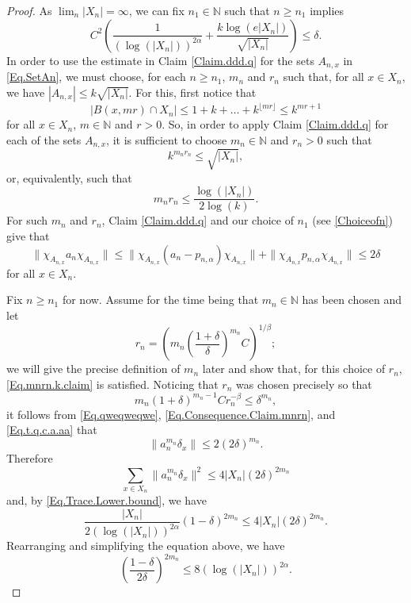 \documentclass[11pt]{amsart}
\newcommand{\N}{\mathbb{N}}
\numberwithin{equation}{section}
\theoremstyle{definition}
\theoremstyle{remark}
\begin{document}
\begin{proof}
As $\lim_n|X_n|=\infty$, we can fix $n_1\in\N$ such that $n\geq n_1$ implies
\begin{equation}\label{Choiceofn}C^2\left(\frac{1}{(\log(|X_n|))^ {2\alpha}}+\frac{k\log(e|X_n|)}{\sqrt{|X_n|}}\right)\leq \delta.\end{equation}
In order to use the estimate in Claim \ref{Claim.ddd.q} for the sets $A_{n,x}$ in \eqref{Eq.SetAn},  we must choose, for each $n\geq n_1$, $m_n$ and $r_n$ such that, for all $x\in  X_n$, we have  $|A_{n,x}|\leq k\sqrt{|X_n|}$. For this, first notice that
\[|B(x,mr)\cap X_n|\leq 1+k+\ldots+k^{\lfloor mr\rfloor}\leq k^{mr+1}\]
for all $x\in X_n$, $m\in \N$ and $r>0$.
So, in order to apply  Claim \ref{Claim.ddd.q} for each of the sets $A_{n,x}$, it is sufficient to choose $m_n\in\N$ and $r_n>0$ such that
\begin{equation*} k^{m_nr_n}\leq \sqrt{|X_n|},\end{equation*}
or, equivalently, such that
\begin{equation}\label{Eq.mnrn.k.claim}{m_nr_n}\leq\frac{ \log(|X_n|)}{2\log(k)}.\end{equation}
For such $m_n$ and $r_n$, Claim \ref{Claim.ddd.q} and our choice of $n_1$ (see \eqref{Choiceofn}) give that
\begin{equation}\label{Eq.Consequence.Claim.mnrn}\|\chi_{A_{n,x}}a_n\chi_{A_{n,x}}\|\leq \|\chi_{A_{n,x}}(a_n-p_{n,\alpha})\chi_{A_{n,x}}\|+\|\chi_{A_{n,x}}p_{n,\alpha}\chi_{A_{n,x}}\|\leq 2\delta\end{equation}
for all $x\in X_n$.

Fix $n\geq n_1$ for now. Assume for the time being that $m_n\in\N$ has been chosen and let
\begin{equation}\label{Eq.Choice.of.rn.1}r_n=\left(m_n\left(\frac{1+\delta}{\delta}\right)^{m_n}C\right)^{1/\beta};\end{equation}
we will give the precise definition of $m_n$  later and show that, for this choice of $r_n$,   \eqref{Eq.mnrn.k.claim} is satisfied.  Noticing that  $r_n$ was chosen precisely so that
\begin{equation}\label{Eq.t.q.c.a.aa}m_n(1+\delta)^{m_n-1}Cr_n^{-\beta}\leq  \delta^{m_n},\end{equation}
it follows from  \eqref{Eq.qweqweqwe}, \eqref{Eq.Consequence.Claim.mnrn},  and \eqref{Eq.t.q.c.a.aa}  that
\[\|a^{m_n}_n\delta_x\|\leq 2 (2\delta)^{m_n}.\]
Therefore
\[\sum_{x\in X_n}\|a^{m_n}_n\delta_x\|^2\leq 4|X_n|(2\delta)^{2m_n}\]
and, by  \eqref{Eq.Trace.Lower.bound}, we have
\[\frac{|X_n|}{2(\log(|X_n|))^{2\alpha}}(1-\delta)^{2m_n}\leq 4|X_n|(2\delta)^{2m_n}. \]
Rearranging and simplifying the equation above, we have
\begin{equation}\label{Eq.1.sep.26.1.rain}\left(\frac{1-\delta}{2\delta}\right)^{2m_n}\leq 8(\log(|X_n|))^{2\alpha}.\end{equation}


\end{proof}
\end{document}
